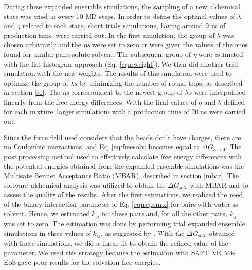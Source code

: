 During these expanded ensemble simulations, the sampling of a new alchemical state was tried at every 10 MD steps. In order to define the optimal values of $\lambda$ and $\eta$ related to each state, short trials simulations, having around 9 ns of production time, were carried out. In the first simulation, the group of $\lambda$ was chosen arbitrarily and the $\eta s$ were set to zero or were given the values of the ones found for similar pairs solute-solvent. The subsequent group of $\eta$ were estimated  with the flat histogram approach (Eq. \eqref{eqn:weight}). We then did another trial simulation with the new weights. The results of this simulation were used to optimize the group of $\lambda s$ by minimizing the number of round trips, as described in section \ref{ee}. The $\eta s$ correspondent to the newest group of $\lambda s$ were interpolated linearly from the free energy differences. With the final values of $\eta$ and $\lambda $ defined for each mixture, larger simulations with a production time of 20 ns were carried out. 

Since the force field used considers that the beads don't have charges, there are no Coulombic interactions, and Eq. \eqref{eq:freesolv} becomes equal to $\Delta G_{3 \rightarrow 4} $. The post processing method used to effectively calculate free energy differences with the potential energies obtained from the expanded ensemble simulations was the Multisate Bennet Acceptance Ratio (MBAR), described in section \ref{mbar}. The software alchemical-analysis \cite{klimovich} was utilized to obtain the $\Delta G_{solv}$ with MBAR and to assess the quality of the results. After the first estimations, we realized the need of the binary interaction parameter of Eq. \eqref{eqn:epsmix} for pairs with water as solvent. Hence, we estimated  $k_{ij}$ for these pairs and, for all the other pairs,  $k_{ij}$ was set to zero. The estimation was done by performing trial  expanded ensemble simulations in three values of $k_{ij}$, as suggested by . With the $\Delta G_{solv}$ obtained with these simulations, we did a linear fit to obtain the refined value of the parameter. We used this strategy because the estimation with SAFT VR Mie EoS gave poor results for the solvation free energies.

